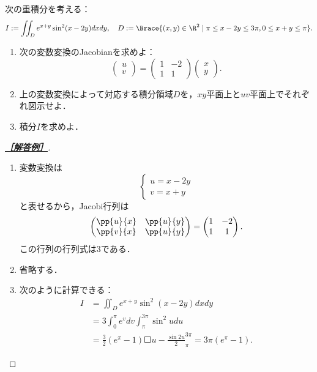 \documentclass[uplatex,dvipdfmx]{jsarticle}
\begin{document}
\begin{tcolorbox}[colframe=ForestGreen, colback=ForestGreen!10!white,breakable,colbacktitle=ForestGreen!40!white,coltitle=black,fonttitle=\bfseries\sffamily,
    title=第２問]
    次の重積分を考える：
    \[I:=\iint_De^{x+y}\sin^2(x-2y)dxdy,\quad D:=\Brace{(x,y)\in\R^2\mid\pi\le x-2y\le 3\pi,0\le x+y\le\pi}.\]
    \begin{enumerate}
        \item 次の変数変換のJacobianを求めよ：
        \[\begin{pmatrix}u\\v\end{pmatrix}=\begin{pmatrix}1&-2\\1&1\end{pmatrix}\begin{pmatrix}x\\y\end{pmatrix}.\]
        \item 上の変数変換によって対応する積分領域$D$を，$xy$平面上と$uv$平面上でそれぞれ図示せよ．
        \item 積分$I$を求めよ．
    \end{enumerate}
\end{tcolorbox}
\begin{proof}[\textbf{\underline{［解答例］}}]\mbox{}
    \begin{enumerate}
        \item 変数変換は
        \[\begin{cases}
            u=x-2y\\
            v=x+y
        \end{cases}\]
        と表せるから，Jacobi行列は
        \[\begin{pmatrix}\pp{u}{x}&\pp{u}{y}\\\pp{v}{x}&\pp{u}{y}\end{pmatrix}=\begin{pmatrix}1&-2\\1&1\end{pmatrix}.\]
        この行列の行列式は3である．
        \item 省略する．
        \item 次のように計算できる：
        \begin{align*}
            I&=\iint_De^{x+y}\sin^2(x-2y)dxdy\\
            &=3\int^\pi_0 e^vdv\int^{3\pi}_\pi\sin^2udu\\
            &=\frac{3}{2}(e^\pi-1)\Square{u-\frac{\sin2 u}{2}}^{3\pi}_\pi=3\pi(e^\pi-1).
        \end{align*}
    \end{enumerate}
\end{proof}
\end{document}
